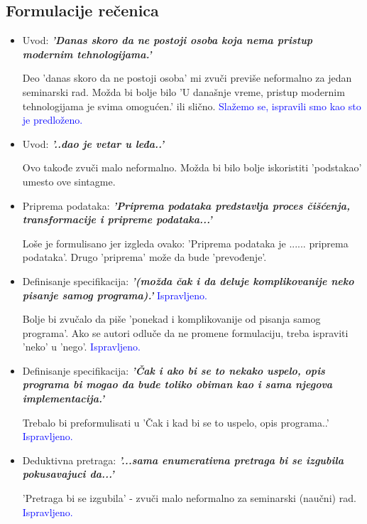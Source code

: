\documentclass[a4paper]{report}
\newcommand{\odgovor}[1]{\textcolor{blue}{#1}}
\begin{document}
\subsection{Formulacije rečenica}
\begin{itemize}
	\item Uvod: \textbf{\textit{'Danas skoro da ne postoji osoba koja nema pristup modernim tehnologijama.'}}

		Deo 'danas skoro da ne postoji osoba' mi zvuči previše neformalno za jedan seminarski rad. Možda bi bolje bilo 'U današnje vreme, pristup modernim tehnologijama je svima omogućen.' ili slično.
		\odgovor {Slažemo se, ispravili smo kao sto je predloženo.}

	\item Uvod: \textbf{\textit{'..dao je vetar u leđa..'}}

    Ovo takođe zvuči malo neformalno. Možda bi bilo bolje iskoristiti 'podstakao' umesto ove sintagme.

    \item Priprema podataka: \textbf{\textit{'Priprema podataka predstavlja proces čišćenja, transformacije i pripreme podataka...'}}

    Loše je formulisano jer izgleda ovako: 'Priprema podataka je ...... priprema podataka'. Drugo 'priprema' može da bude 'prevođenje'.

    \item Definisanje specifikacija: \textbf{\textit{'(možda čak i da deluje komplikovanije neko pisanje samog programa).'}}
    \odgovor {Ispravljeno.}

    Bolje bi zvučalo da piše 'ponekad i komplikovanije od pisanja samog programa'. Ako se autori odluče da ne promene formulaciju, treba ispraviti 'neko' u 'nego'.
    \odgovor {Ispravljeno.}

    \item Definisanje specifikacija: \textbf{\textit{'Čak i ako bi se to nekako uspelo, opis programa bi mogao da bude toliko obiman kao i sama njegova implementacija.'}}

    Trebalo bi preformulisati u 'Čak i kad bi se to uspelo, opis programa..'
    \odgovor {Ispravljeno.}

    \item Deduktivna pretraga: \textbf{\textit{'...sama enumerativna pretraga bi se izgubila pokusavajuci da...'}}

    'Pretraga bi se izgubila' - zvuči malo neformalno za seminarski (naučni) rad.
    \odgovor {Ispravljeno.}


\end{itemize}
\end{document}
